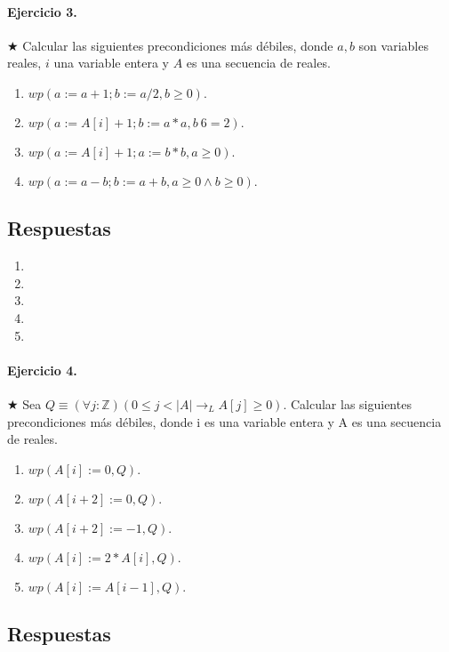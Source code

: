 \documentclass{article}
\begin{document}
\paragraph{Ejercicio 3.} $\bigstar$ Calcular las siguientes precondiciones más débiles, donde 
$a, b$ son variables reales, $i$ una variable entera y $A$
es una secuencia de reales.

\begin{enumerate}[label=\alph*)]
\item $wp(a := a+1; b := a/2, b \geq 0).$
\item $wp(a := A[i] + 1; b := a*a, b\  6= 2).$
\item $wp(a := A[i] + 1; a := b*b, a \geq 0).$
\item $wp(a := a-b; b := a+b, a \geq 0 \wedge b \geq 0).$
\end{enumerate}

\subsection*{Respuestas}

\begin{enumerate}[label=\alph*)]
	\item
	\item
	\item
	\item
	\item
\end{enumerate}

\paragraph{Ejercicio 4.} $\bigstar$ Sea $Q \equiv (\forall j :\mathbb{Z})(0 \leq j < |A| \rightarrow_L
 A[j] \geq 0)$. Calcular las 
siguientes precondiciones más débiles, donde i es
una variable entera y A es una secuencia de reales.

\begin{enumerate}[label=\alph*)]
\item $wp(A[i] := 0, Q).$
\item $wp(A[i+2] := 0, Q).$
\item $wp(A[i+2] := -1, Q).$
\item $wp(A[i] := 2 * A[i], Q).$
\item $wp(A[i] := A[i-1], Q).$
\end{enumerate}

\subsection*{Respuestas}
\end{document}

